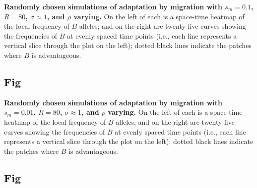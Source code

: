 \documentclass[10pt,letterpaper]{article}
\begin{document}
\textbf{Randomly chosen simulations of adaptation by migration
with $s_m=0.1$, $R=80$, $\sigma\approx 1$, and $\rho$ varying.}
    On the left of each is a space-time heatmap of the local frequency of $B$ alleles;
    and on the right are twenty-five curves showing the frequencies of $B$ at evenly spaced time points
    (i.e., each line represents a vertical slice through the plot on the left);
    dotted black lines indicate the patches where $B$ is advantageous.

\subsection{Fig}
\label{sfig:sims_6}

\textbf{Randomly chosen simulations of adaptation by migration
with $s_m=0.01$, $R=80$, $\sigma\approx 1$, and $\rho$ varying.}
    On the left of each is a space-time heatmap of the local frequency of $B$ alleles;
    and on the right are twenty-five curves showing the frequencies of $B$ at evenly spaced time points
    (i.e., each line represents a vertical slice through the plot on the left);
    dotted black lines indicate the patches where $B$ is advantageous.
\subsection{Fig}
\label{sfig:sims_7}
\end{document}
